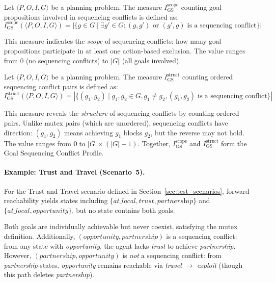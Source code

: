 \begin{defn}
    Let $\langle P, O, I, G \rangle$ be a planning problem. The measure $I^{\text{scope}}_{\text{GS}}$ counting goal propositions involved in sequencing conflicts is defined as:
    \begin{equation*}
        I^{\text{scope}}_{\text{GS}}(\langle P, O, I, G \rangle) = |\{g \in G \mid \exists g' \in G : (g, g') \text{ or } (g', g) \text{ is a sequencing conflict}\}|
    \end{equation*}
\end{defn}

This measure indicates the \emph{scope} of sequencing conflicts: how many goal propositions participate in at least one action-based exclusion. The value ranges from $0$ (no sequencing conflicts) to $|G|$ (all goals involved).

\begin{defn}
    Let $\langle P, O, I, G \rangle$ be a planning problem. The measure $I^{\text{struct}}_{\text{GS}}$ counting ordered sequencing conflict pairs is defined as:
    \begin{equation*}
        I^{\text{struct}}_{\text{GS}}(\langle P, O, I, G \rangle) = |\{(g_1, g_2) \mid g_1, g_2 \in G, g_1 \neq g_2, (g_1, g_2) \text{ is a sequencing conflict}\}|
    \end{equation*}
\end{defn}

This measure reveals the \emph{structure} of sequencing conflicts by counting ordered pairs. Unlike mutex pairs (which are unordered), sequencing conflicts have direction: $(g_1, g_2)$ means achieving $g_1$ blocks $g_2$, but the reverse may not hold. The value ranges from $0$ to $|G| \times (|G|-1)$. Together, $I^{\text{scope}}_{\text{GS}}$ and $I^{\text{struct}}_{\text{GS}}$ form the Goal Sequencing Conflict Profile.

\paragraph{Example: Trust and Travel (Scenario~5).} For the Trust and Travel scenario defined in Section~\ref{sec:test_scenarios}, forward reachability yields states including $\{\textit{at\_local}, \textit{trust}, \textit{partnership}\}$ and $\{\textit{at\_local}, \textit{opportunity}\}$, but no state contains both goals.

Both goals are individually achievable but never coexist, satisfying the mutex definition. Additionally, $(\textit{opportunity}, \textit{partnership})$ is a sequencing conflict: from any state with \textit{opportunity}, the agent lacks \textit{trust} to achieve \textit{partnership}. However, $(\textit{partnership}, \textit{opportunity})$ is \emph{not} a sequencing conflict: from \textit{partnership}-states, \textit{opportunity} remains reachable via \textit{travel} $\rightarrow$ \textit{exploit} (though this path deletes \textit{partnership}).

